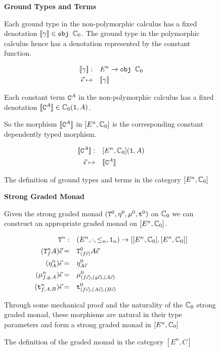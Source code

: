 \documentclass{Report}
\begin{document}
\begin{figure}
    \begin{framed}
        \centering\textbf{Ground Types and Terms}

        Each ground type in the non-polymorphic calculus has a fixed denotation ${\bf [\![}\gamma{\bf ]\!]}\in\texttt{obj }\mathbb{C}_0$. The ground type in the polymorphic calculus hence has a denotation represented by the constant function.
        
        \begin{align}
            {\bf [\![}\gamma{\bf ]\!]}:&\quad E^n\rightarrow \texttt{obj }\mathbb{C}_0\\
            \vec{\epsilon} \mapsto&\quad  {\bf [\![}\gamma{\bf ]\!]}\\
        \end{align}
        
        Each constant term $\texttt{C}^{A}$ in the non-polymorphic calculus has a fixed denotation ${\bf [\![}\texttt{C}^{A}{\bf ]\!]}\in\mathbb{C}_0(\texttt{1}, A)$.
        
        So the morphism ${\bf [\![}\texttt{C}^{A}{\bf ]\!]}$ in $[E^n, \mathbb{C}_0]$ is the corresponding constant dependently typed morphism.
        
        \begin{align}
            {\bf [\![}\texttt{C}^{A}{\bf ]\!]}:&\quad[E^n, \mathbb{C}_0](\texttt{1}, A)\\
            \vec{\epsilon}\mapsto&\quad{\bf [\![}\texttt{C}^{A}{\bf ]\!]}
        \end{align}        
    \end{framed}
    \caption{The definition of ground types and terms in the category $[E^n, \mathbb{C}_0]$ }
    \label{HowToBuildGround}
\end{figure}


\begin{figure}
    \begin{framed}
        \centering\textbf{Strong Graded Monad}

Given the strong graded monad $(\texttt{T}^0_{}, \eta_{}^0, \mu^0, \texttt{t}^0)$ on $\mathbb{C}_0$ we can construct an appropriate graded monad on $[E^n, \mathbb{C}_0]$.

\begin{align}
    \texttt{T}^n_{}:&\quad(E^n, \cdot, \leq_n, \texttt{1}_n) \rightarrow [[E^n, \mathbb{C}_0], [E^n, \mathbb{C}_0]]\\
    (\texttt{T}^n_{f}A)\vec{\epsilon}=&\quad \texttt{T}^0_{(f\vec{\epsilon})}A\vec{\epsilon}\\
    (\eta_{A}^n)\vec{\epsilon}=&\quad\eta_{A\vec{\epsilon}}^0\\
    (\mu_{f, g, A}^n)\vec{\epsilon}=&\quad\mu_{(f\vec{\epsilon}), (g\vec{\epsilon}), (A\vec{\epsilon})}^0\\
    (\texttt{t}_{f, A, B}^n)\vec{\epsilon}=&\quad\texttt{t}_{(f\vec{\epsilon}), (A\vec{\epsilon}), (B\vec{\epsilon})}^0
\end{align}

Through some mechanical proof and the naturality of the $\mathbb{C}_0$ strong graded monad, these morphisms are natural in their type parameters and form a strong graded monad in $[E^n, \mathbb{C}_0]$

    \end{framed}
    \caption{The definition of the graded monad in the category $[E^n, C]$}
    \label{HowToBuildMonad}
\end{figure}
\end{document}
